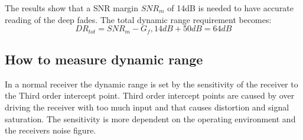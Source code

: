 The results show that a SNR margin $SNR_m$ of 14dB is needed to have accurate reading of the deep fades.
The total dynamic range requirement becomes:
\begin{equation}
DR_{tot} = SNR_m - G_f , 14dB + 50dB = 64dB 
\end{equation}
\begin{where}
\end{where}



\subsection{How to measure dynamic range}

In a normal receiver the dynamic range is set by the sensitivity of the receiver to the Third order intercept point. Third order intercept points are caused by over driving the receiver with too much input and that causes distortion and signal saturation. The sensitivity is more dependent on the operating environment and the receivers noise figure. \citep{understandDynamic}


